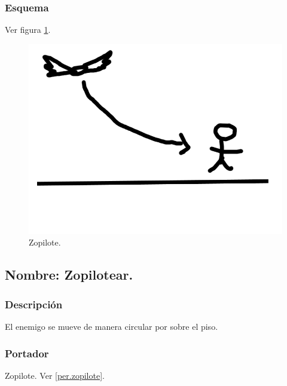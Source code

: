 \documentclass[11pt,letterpaper]{article}
\begin{document}
		\subsubsection{Esquema}
		Ver figura \ref{fig:rapto}.
		\begin{figure}
			\centering
			\includegraphics[height=0.2 \textheight]{Imagenes/rapto}
			\caption{Zopilote.}
			\label{fig:rapto}
		\end{figure}
	\subsection{Nombre: Zopilotear.} \label{hab.zopilotear}
		\subsubsection{Descripción}
		El enemigo se mueve de manera circular por sobre el piso.
		\subsubsection{Portador}
		Zopilote. Ver \ref{per.zopilote}.
\end{document}
